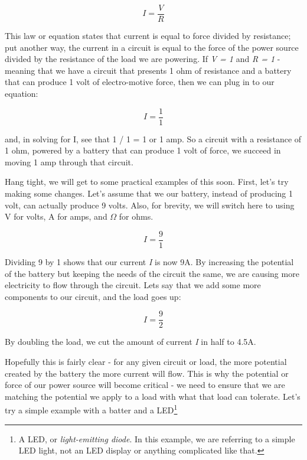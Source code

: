 \documentclass[10pt]{report}
\begin{document}
\begin{equation}
I = \frac{V}{R}
\end{equation}

This law or equation states that current is equal to force divided by resistance; put another way, the current in a circuit is equal to the force of the power source divided by the resistance of the load we are powering. If \textit{V = 1} and \textit{R = 1} - meaning that we have a circuit that presents 1 ohm of resistance and a battery that can produce 1 volt of electro-motive force, then we can plug in to our equation:

\begin{equation}
I = \frac{1}{1}
\end{equation}

and, in solving for I, see that 1 / 1 = 1 or 1 amp. So a circuit with a resistance of 1 ohm, powered by a battery that can produce 1 volt of force, we succeed in moving 1 amp through that circuit. 

Hang tight, we will get to some practical examples of this soon. First, let's try making some changes. Let's assume that we our battery, instead of producing 1 volt, can actually produce 9 volts. Also, for brevity, we will switch here to using V for volts, A for amps, and  $\Omega$ for ohms.

\begin{equation}
I = \frac{9}{1}
\end{equation}

Dividing 9 by 1 shows that our current \textit{I} is now 9A. By increasing the potential of the battery but keeping the needs of the circuit the same, we are causing more electricity to flow through the circuit. Lets say that we add some more components to our circuit, and the load goes up:

\begin{equation}
I = \frac{9}{2}
\end{equation}

By doubling the load, we cut the amount of current \textit{I} in half to 4.5A. 

Hopefully this is fairly clear - for any given circuit or load, the more potential created by the battery the more current will flow. This is why the potential or force of our power source will become critical - we need to ensure that we are matching the potential we apply to a load with what that load can tolerate. Let's try a simple example with a batter and a LED\footnote{A LED, or \textit{light-emitting diode}. In this example, we are referring to a simple LED light, not an LED display or anything complicated like that.}
\end{document}

